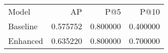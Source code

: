 \begin{tabular}{lrrr}
Model & AP & P@5 & P@10 \\
Baseline & 0.575752 & 0.800000 & 0.400000 \\
Enhanced & 0.635220 & 0.800000 & 0.700000 \\
\end{tabular}
